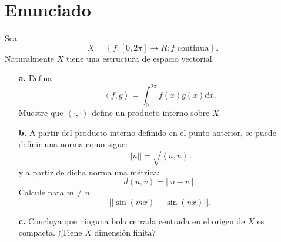 \documentclass{report}
\begin{document}
\section{Enunciado}

Sea \[
X = \left\{ f:\left[ 0, 2\pi \right] \to R: \text{$f$ continua} \right\} 
.\] Naturalmente $X$ tiene una estructura de espacio vectorial.
\begin{enumerate}
  \item[\textbf{a.}] Defina \[
      \left<f, g \right> = \int_0^{2\pi}f\left( x \right) g\left( x \right) dx	
    .\] Muestre que $\left< \cdot, \cdot\right>$ define un producto interno sobre $X$.
  \item[\textbf{b.}] A partir del producto interno definido en el punto anterior, se puede definir una norma como sigue: \[
      \left| \left| u \right|  \right|  = \sqrt{\left<u, u \right>} 
      .\] y a partir de dicha norma una métrica: \[
      d(u, v) =  \left| \left| u - v \right|  \right| 
      .\] Calcule para $m \neq n$ \[
      \left| \left| \sin\left( mx \right) - \sin\left( nx \right)  \right|  \right| 
    .\] 
  \item[\textbf{c.}] Concluya que ninguna bola cerrada centrada en el origen de $X$ es compacta. ¿Tiene $X$ dimensión finita?
\end{enumerate}
\end{document}
